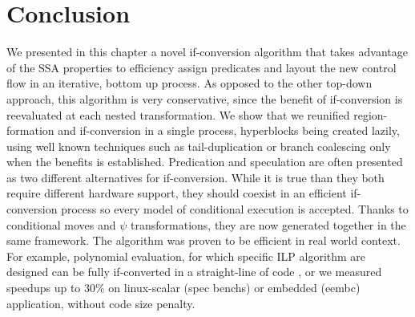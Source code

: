 \section{Conclusion} 
We presented in this chapter a novel if-conversion algorithm that takes advantage of the SSA properties to efficiency assign predicates and layout the new control flow in an iterative, bottom up process. As opposed to the other top-down approach, this algorithm is very conservative, since the benefit of if-conversion is reevaluated at each nested transformation.
We show that we reunified region-formation and if-conversion in a single process, hyperblocks being created lazily, using well known techniques such as tail-duplication or branch coalescing only when the benefits is established.
Predication and speculation are often presented as two different alternatives for if-conversion. While it is true than they both require different hardware support, they should coexist in an efficient if-conversion process so every model of conditional execution is accepted. Thanks to conditional moves and $\psi$ transformations, they are now generated together in the same framework. The algorithm was proven to be efficient in real world context. For example, polynomial evaluation, for which specific ILP algorithm are designed can be fully if-converted in a straight-line of code \cite{JeKnMoRe11}, or we measured speedups up to 30\% on linux-scalar (spec benchs)  or embedded (eembc) application, without code size penalty.





